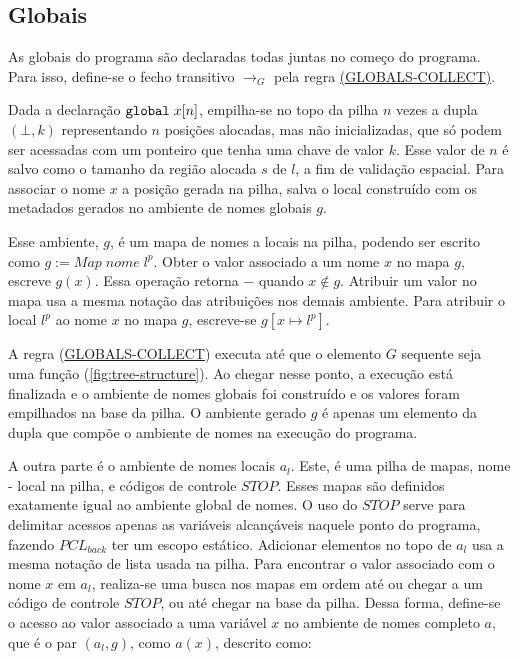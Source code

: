\subsection{Globais}
\label{sec:pcl-back:semantica:globals}

As globais do programa são declaradas todas juntas no começo do programa. Para isso, define-se o fecho transitivo $\to_G$ pela regra \hyperref[rule:globals-collect]{(GLOBALS-COLLECT)}.


\noindent Dada a declaração $\texttt{global}\;x[n]$, empilha-se no topo da pilha $n$ vezes a dupla $(\bot, k)$ representando $n$ posições alocadas, mas não inicializadas, que só podem ser acessadas com um ponteiro que tenha uma chave de valor $k$. Esse valor de $n$ é salvo como o tamanho da região alocada $s$ de $l$, a fim de validação espacial. Para associar o nome $x$ a posição gerada na pilha, salva o local construído com os metadados gerados no ambiente de nomes globais $g$.

Esse ambiente, $g$, é um mapa de nomes a locais na pilha, podendo ser escrito como $g := Map\;nome\;l^p$. Obter o valor associado a um nome $x$ no mapa $g$, escreve $g(x)$. Essa operação  retorna $-$ quando $x \notin g$. Atribuir um valor no mapa usa a mesma notação das atribuições nos demais ambiente. Para atribuir o local $l^p$ ao nome $x$ no mapa $g$, escreve-se $g[x \mapsto l^p]$. 

A regra (\hyperref[rule:globals-collect]{GLOBALS-COLLECT}) executa até que o elemento $G$ sequente seja uma função (\ref{fig:tree-structure}). Ao chegar nesse ponto, a execução está finalizada e o ambiente de nomes globais foi construído e os valores foram empilhados na base da pilha. O ambiente gerado $g$ é apenas um elemento da dupla que compõe o ambiente de nomes na execução do programa. 

A outra parte é o ambiente de nomes locais $a_l$. Este, é uma pilha de mapas, nome - local na pilha, e códigos de controle $STOP$. Esses mapas são definidos exatamente igual ao ambiente global de nomes. O uso do $STOP$ serve para delimitar acessos apenas as variáveis alcançáveis naquele ponto do programa, fazendo $PCL_{back}$ ter um escopo estático. Adicionar elementos no topo de $a_l$ usa a mesma notação de lista usada na pilha. Para encontrar o valor associado com o nome $x$ em $a_l$, realiza-se uma busca nos mapas em ordem até ou chegar a um código de controle $STOP$, ou até chegar na base da pilha. Dessa forma, define-se o acesso ao valor associado a uma variável $x$ no ambiente de nomes completo $a$, que é o par $(a_l, g)$, como $a(x)$, descrito como:

